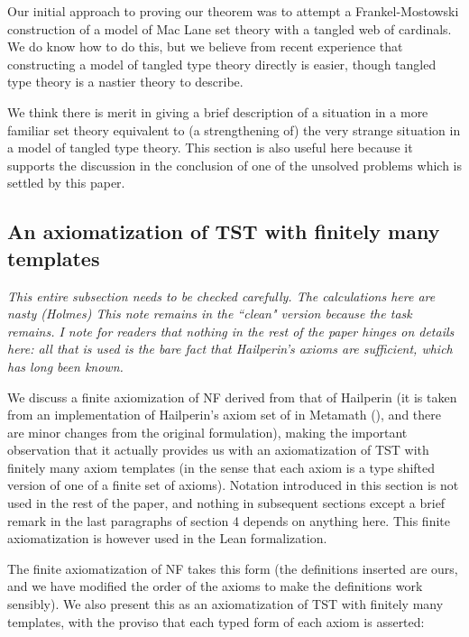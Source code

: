 \documentclass[112pt]{article}
\theoremstyle{definition}
\theoremstyle{remark}
\newcommand{\rk}[1]{{\color{blue}\sl #1}}
\begin{document}
Our initial approach to proving our theorem was to attempt a Frankel-Mostowski construction of a model of Mac Lane set theory with a tangled web of cardinals.  We do know how to do this, but we believe from recent experience that constructing a model of tangled type theory directly is easier, though tangled type theory is a nastier theory to describe.

We think there is merit in giving a brief description of a situation in a more familiar set theory equivalent to (a strengthening of) the very strange situation in a model of tangled type theory.  This section is also useful here because it supports the discussion in the conclusion of one of the unsolved problems which is settled by this paper.

\newpage

\subsection{An axiomatization of TST with finitely many templates}\label{ss:hailperin}

\rk{This entire subsection needs to be checked carefully.  The calculations here are nasty (Holmes)  This note remains in the ``clean" version because the task remains.  I note for readers that nothing in the rest of the paper hinges on details here:  all that is used is the bare fact that Hailperin's axioms are sufficient, which has long been known.}


We discuss a finite axiomization of NF derived from that of Hailperin (it is taken from an implementation of Hailperin's axiom set of \cite{hailperin} in Metamath (\cite{metamath}), and there are minor changes from the original formulation), making the important observation that it actually provides us with an axiomatization of TST with finitely many
axiom templates (in the sense that each axiom is a type shifted version of one of a finite set of axioms).  Notation introduced in this section is not used in the rest of the paper, and nothing in subsequent sections except a brief remark in the last paragraphs of section 4 depends on anything here.  This finite axiomatization is however used in the Lean formalization.

The finite axiomatization of NF takes this form (the definitions inserted are ours, and we have modified the order of the axioms to make the definitions work sensibly).  We also present this as an axiomatization of TST with finitely many templates, with the proviso that each typed form of each axiom is asserted:
\end{document}
